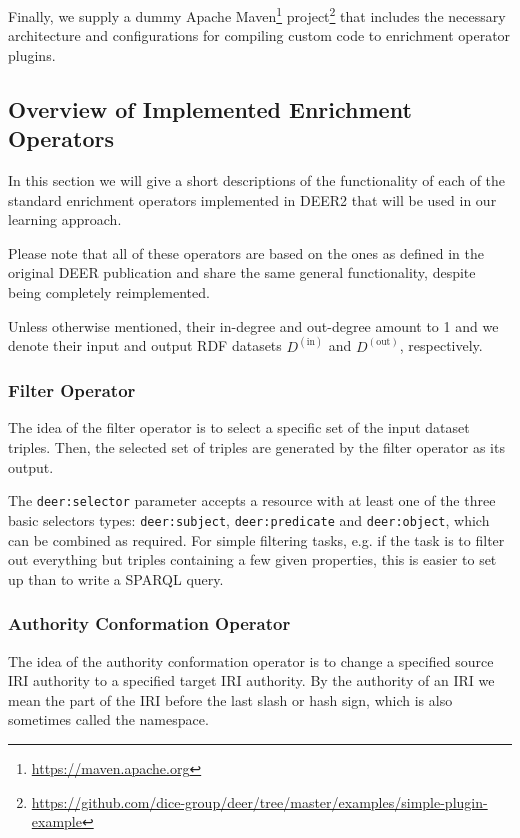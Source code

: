 Finally, we supply a dummy Apache Maven\footnote{\url{https://maven.apache.org}} project\footnote{\url{https://github.com/dice-group/deer/tree/master/examples/simple-plugin-example}} that includes the necessary architecture and configurations for compiling custom code to enrichment operator plugins.

\subsection{Overview of Implemented Enrichment Operators}
\label{ssec:ops}
In this section we will give a short descriptions of the functionality of each of the standard enrichment operators implemented in \ac{DEER2} that will be used in our learning approach.

Please note that all of these operators are based on the ones as defined in the original \ac{DEER} publication\cite{sherif:2015a} and share the same general functionality, despite being completely reimplemented.

Unless otherwise mentioned, their in-degree and out-degree amount to 1 and we denote their input and output \ac{RDF} datasets $D^{(\text{in})}$ and $D^{(\text{out})}$, respectively.

\subsubsection*{Filter Operator}

The idea of the filter operator is to select a specific set of the input dataset triples.
Then, the selected set of triples are generated by the filter operator as its output.

The \texttt{deer:selector} parameter accepts a resource with at least one of the three basic selectors types: \texttt{deer:subject}, \texttt{deer:predicate} and \texttt{deer:object}, which can be combined as required.
For simple filtering tasks, e.g. if the task is to filter out everything but triples containing a few given properties, this is easier to set up than to write a \ac{SPARQL} query.


\subsubsection*{Authority Conformation Operator}

The idea of the authority conformation operator is to change a specified source \ac{IRI} authority to a specified target \ac{IRI} authority.
By the authority of an \ac{IRI} we mean the part of the \ac{IRI} before the last slash or hash sign, which is also sometimes called the namespace.\\

